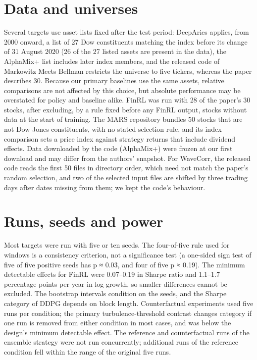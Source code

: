 \documentclass[12pt,a4paper]{report}
\begin{document}
\section{Data and universes}\label{data-and-universes}

Several targets use asset lists fixed after the test period: DeepAries
applies, from 2000 onward, a list of 27 Dow constituents matching the
index before its change of 31 August 2020 (26 of the 27 listed assets
are present in the data), the AlphaMix+ list includes later index
members, and the released code of Markowitz Meets Bellman restricts the
universe to five tickers, whereas the paper describes 30. Because our
primary baselines use the same assets, relative comparisons are not
affected by this choice, but absolute performance may be overstated for
policy and baseline alike. FinRL was run with 28 of the paper's 30
stocks, after excluding, by a rule fixed before any FinRL output, stocks
without data at the start of training. The MARS repository bundles 50
stocks that are not Dow Jones constituents, with no stated selection
rule, and its index comparison sets a price index against strategy
returns that include dividend effects. Data downloaded by the code
(AlphaMix+) were frozen at our first download and may differ from the
authors' snapshot. For WaveCorr, the released code reads the first 50
files in directory order, which need not match the paper's random
selection, and two of the selected input files are shifted by three
trading days after dates missing from them; we kept the code's
behaviour.

\section{Runs, seeds and power}\label{runs-seeds-and-power}

Most targets were run with five or ten seeds. The four-of-five rule used
for windows is a consistency criterion, not a significance test (a
one-sided sign test of five of five positive seeds has p ≈ 0.03, and
four of five p ≈ 0.19). The minimum detectable effects for FinRL were
0.07--0.19 in Sharpe ratio and 1.1--1.7 percentage points per year in
log growth, so smaller differences cannot be excluded. The bootstrap
intervals condition on the seeds, and the Sharpe category of DDPG
depends on block length. Counterfactual experiments used five runs per
condition; the primary turbulence-threshold contrast changes category if
one run is removed from either condition in most cases, and was below
the design's minimum detectable effect. The reference and counterfactual
runs of the ensemble strategy were not run concurrently; additional runs
of the reference condition fell within the range of the original five
runs.
\end{document}

